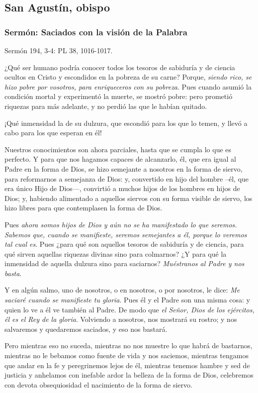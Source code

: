 \subsection{San Agustín, obispo}

\subsubsection{Sermón: Saciados con la visión de la Palabra}

Sermón 194, 3-4: PL 38, 1016-1017.

¿Qué ser humano podría conocer todos los tesoros de sabiduría y de ciencia ocultos en Cristo y escondidos en la pobreza de su carne? Porque, \emph{siendo rico, se hizo pobre por vosotros, para enriqueceros con su pobreza}. Pues cuando asumió la condición mortal y experimentó la muerte, se mostró pobre: pero prometió riquezas para más adelante, y no perdió las que le habían quitado.

¡Qué inmensidad la de su dulzura, que escondió para los que lo temen, y llevó a cabo para los que esperan en él!

Nuestros conocimientos son ahora parciales, hasta que se cumpla lo que es perfecto. Y para que nos hagamos capaces de alcanzarlo, él, que era igual al Padre en la forma de Dios, se hizo semejante a nosotros en la forma de siervo, para reformarnos a semejanza de Dios: y, convertido en hijo del hombre --él, que era único Hijo de Dios---, convirtió a muchos hijos de los hombres en hijos de Dios; y, habiendo alimentado a aquellos siervos con su forma visible de siervo, los hizo libres para que contemplasen la forma de Dios.

Pues \emph{ahora somos hijos de Dios y aún no se ha manifestado lo que seremos. Sabemos que, cuando se manifieste, seremos semejantes a él, porque lo veremos tal cual es}. Pues ¿para qué son aquellos tesoros de sabiduría y de ciencia, para qué sirven aquellas riquezas divinas sino para colmarnos? ¿Y para qué la inmensidad de aquella dulzura sino para saciarnos? \emph{Muéstranos al Padre y nos basta}.

Y en algún salmo, uno de nosotros, o en nosotros, o por nosotros, le dice: \emph{Me saciaré cuando se manifieste tu gloria}. Pues él y el Padre son una misma cosa: y quien lo ve a él ve también al Padre. De modo que \emph{el Señor, Dios de los ejércitos, él es el Rey de la gloria}. Volviendo a nosotros, nos mostrará su rostro; y nos salvaremos y quedaremos saciados, y eso nos bastará.

Pero mientras eso no suceda, mientras no nos muestre lo que habrá de bastarnos, mientras no le bebamos como fuente de vida y nos saciemos, mientras tengamos que andar en la fe y peregrinemos lejos de él, mientras tenemos hambre y sed de justicia y anhelamos con inefable ardor la belleza de la forma de Dios, celebremos con devota obsequiosidad el nacimiento de la forma de siervo.

